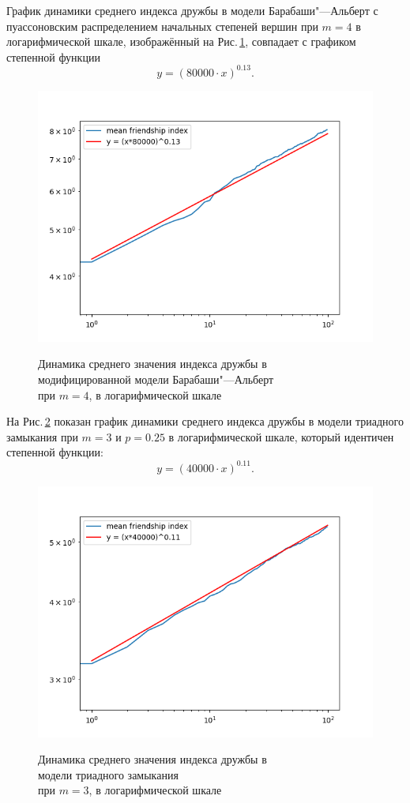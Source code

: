 \documentclass[bachelor, och, diploma]{SCWorks}
\begin{document}
График динамики среднего индекса дружбы в модели Барабаши"---Альберт с пуассоновским распределением начальных степеней вершин при $m=4$ в логарифмической шкале, изображённый на Рис.\,\ref{fig:bapdl3}, совпадает с графиком степенной функции
\[
y=(80000 \cdot x)^{0.13}.
\]
\begin{figure}[!ht]
\centering
\includegraphics[scale=0.7]{diploma_results/dynamic_log/bap_mean_beta_4.png}\\
\caption{Динамика среднего значения индекса дружбы  в\\ модифицированной модели Барабаши"---Альберт\\ при $m=4$, в логарифмической шкале}\label{fig:bapdl3}
\end{figure}

На Рис.\,\ref{fig:triaddl3} показан график динамики среднего индекса дружбы в модели триадного замыкания при $m=3$ и $ p=0.25 $ в логарифмической шкале, который идентичен степенной функции:
\[
y=(40000 \cdot x)^{0.11}.
\]
\begin{figure}[!ht]
\centering
\includegraphics[scale=0.7]{diploma_results/dynamic_log/triad_mean_beta_3_0.25.png}\\
\caption{Динамика среднего значения индекса дружбы  в\\ модели триадного замыкания\\при $m=3$, в логарифмической шкале}\label{fig:triaddl3}
\end{figure}
\end{document}
